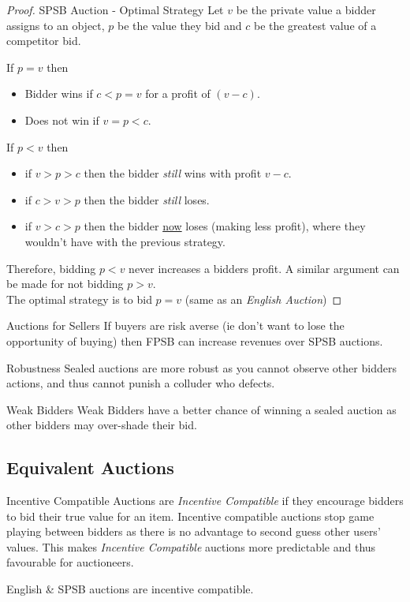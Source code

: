 \documentclass[11pt,a4paper]{article}
\begin{document}
\begin{proof}{SPSB Auction - Optimal Strategy}
  Let $v$ be the private value a bidder assigns to an object, $p$ be the value they bid and $c$ be the greatest value of a competitor bid.
  \par If $p=v$ then
  \begin{itemize}
    \item Bidder wins if $c<p=v$ for a profit of $(v-c)$.
    \item Does not win if $v=p<c$.
  \end{itemize}
  If $p<v$ then
  \begin{itemize}
    \item if $v>p>c$ then the bidder \textit{still} wins with profit $v-c$.
    \item if $c>v>p$ then the bidder \textit{still} loses.
    \item if $v>c>p$ then the bidder \underline{now} loses (making less profit), where they wouldn't have with the previous strategy.
  \end{itemize}
  Therefore, bidding $p<v$ never increases a bidders profit. A similar argument can be made for not bidding $p>v$.\\
  The optimal strategy is to bid $p=v$ (same as an \textit{English Auction})
\end{proof}

\begin{remark}{Auctions for Sellers}
  If buyers are risk averse (ie don't want to lose the opportunity of buying) then FPSB can increase revenues over SPSB auctions.
\end{remark}

\begin{remark}{Robustness}
  Sealed auctions are more robust as you cannot observe other bidders actions, and thus cannot punish a colluder who defects.
\end{remark}

\begin{remark}{Weak Bidders}
  Weak Bidders have a better chance of winning a sealed auction as other bidders may over-shade their bid.
\end{remark}

\subsection{Equivalent Auctions}

\begin{definition}{Incentive Compatible}
  Auctions are \textit{Incentive Compatible} if they encourage bidders to bid their true value for an item. Incentive compatible auctions stop game playing between bidders as there is no advantage to second guess other users' values. This makes \textit{Incentive Compatible} auctions more predictable and thus favourable for auctioneers.
  \par English \& SPSB auctions are incentive compatible.
\end{definition}
\end{document}
